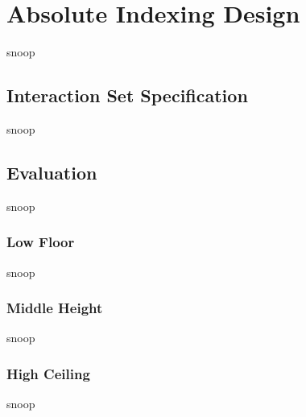 \chapter{Absolute Indexing Design}
snoop
\section{Interaction Set Specification}
snoop
\section{Evaluation}
snoop
\subsection{Low Floor}
snoop
\subsection{Middle Height}
snoop
\subsection{High Ceiling}
snoop